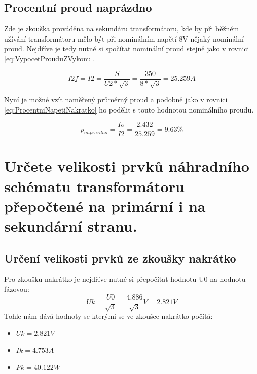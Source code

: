 \documentclass{protokol}
\begin{document}
\subsection{Procentní proud naprázdno}
Zde je zkouška prováděna na sekundáru transformátoru, kde by při běžném užívání transformátoru mělo být při nominálním napětí 8V nějaký nominální proud. Nejdříve je tedy nutné si spočítat nominální proud stejně jako v rovnici \ref{eq:VypocetProuduZVykonu}.

\begin{equation}
    I2f = I2 = \frac{S}{U2*\sqrt{3}} = \frac{350}{8*\sqrt{3}} = 25.259 A
    \label{eq:VypocetProuduZVykonuNaSekundaru}
\end{equation}

Nyní je možné vzít naměřený průměrný proud a podobně jako v rovnici \ref{eq:ProcentniNapetiNakratko} ho podělit s touto hodnotou nominálního proudu.

\begin{equation}
    p_{naprazdno} = \frac{Io}{I2} = \frac{2.432}{25.259} = 9.63 \%
    \label{eq:ProcentniProudNaprazdno}
\end{equation}

\section{Určete velikosti prvků náhradního schématu transformátoru přepočtené na primární
i na sekundární stranu.}
\subsection{Určení velikosti prvků ze zkoušky nakrátko}
Pro zkoušku nakrátko je nejdříve nutné si přepočítat hodnotu U0 na hodnotu fázovou:
\begin{equation}
    Uk = \frac{U0}{\sqrt{3}} = \frac{4.886}{\sqrt{3}} V = 2.821 V
\end{equation}
Tohle nám dává hodnoty se kterými se ve zkoušce nakrátko počítá:
\begin{itemize}
    \item $Uk = 2.821 V$
    \item $Ik = 4.753 A$
    \item $Pk = 40.122 W$
\end{itemize}
\end{document}
